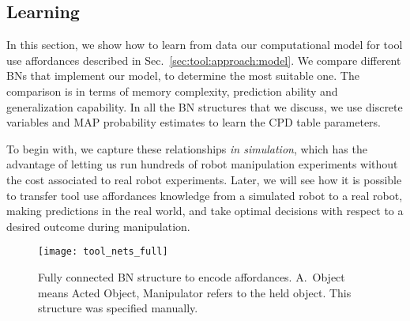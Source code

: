 \subsection{Learning}
\label{sec:tool:approach:learning}

In this section, we show how to learn from data our computational model for tool use affordances described in Sec.~\ref{sec:tool:approach:model}.
We compare different \aclp{BN} that implement our model, to determine the most suitable one.
The comparison is in terms of memory complexity, prediction ability and generalization capability.
In all the \acl{BN} structures that we discuss, we use discrete variables and \ac{MAP} probability estimates to learn the \ac{CPD} table parameters.

To begin with, we capture these relationships \emph{in simulation}, which has the advantage of letting us run hundreds of robot manipulation experiments without the cost associated to real robot experiments.
Later, we will see how it is possible to transfer tool use affordances knowledge from a simulated robot to a real robot, making predictions in the real world, and take optimal decisions with respect to a desired outcome during manipulation.

\begin{figure}
\centering
\texttt{[image: tool\_nets\_full]}
\caption[Fully connected \acl{BN} structure to encode \intobj{} affordances.]{Fully connected \acl{BN} structure to encode \intobj{} affordances.
A.~Object means Acted Object, Manipulator refers to the held object.
This structure was specified manually.}
\label{fig:tool:nets:full}
\end{figure}

